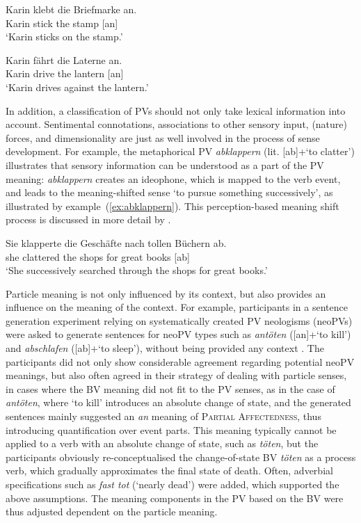 \documentclass[output=paper]{langsci/langscibook}
\begin{document}
\ea\label{ex:ankleben}
\gll Karin klebt die Briefmarke an.\\
Karin stick the stamp [an]\\
\glt `Karin sticks on the stamp.'
\z

\ea\label{ex:anfahrenLaterne1}
\gll Karin fährt die Laterne an.\\
Karin drive the lantern [an]\\
\glt `Karin drives against the lantern.'
\z

In addition, a classification of PVs should not only take lexical
information into account. Sentimental connotations, associations to
other sensory input, (nature) forces, and dimensionality are just as
well involved in the process of sense development. For example, the
metaphorical PV \textit{abklappern} (lit. [ab]+`to clatter')
illustrates that sensory information can be understood as a part of
the PV meaning: \textit{abklappern} creates an ideophone, which is
mapped to the verb event, and leads to the meaning-shifted sense `to
pursue something successively', as illustrated by
example~(\ref{ex:abklappern}). This perception-based meaning shift
process is discussed in more detail by \cite{SpringorumEtAl:13}.

\ea\label{ex:abklappern}
\gll Sie klapperte die Geschäfte nach tollen Büchern ab.\\
she clattered the shops for great books [ab]\\
\glt `She successively searched through the shops for great books.'
\z

Particle meaning is not only influenced by its context, but also
provides an influence on the meaning of the context. For example,
participants in a sentence generation experiment relying on
systematically created PV neologisms (neoPVs) were asked to generate
sentences for neoPV types such as \textit{antöten} ([an]+`to kill')
and \textit{abschlafen} ([ab]+`to sleep'), without being provided any
context \citep{SpringorumEtAl:13cALTER}. The participants did not only
show considerable agreement regarding potential neoPV meanings, but
also often agreed in their strategy of dealing with particle senses,
in cases where the BV meaning did not fit to the PV senses, as in the
case of \textit{antöten}, where `to kill' introduces an absolute
change of state, and the generated sentences mainly suggested an
\textit{an} meaning of \textsc{Partial Affectedness}, thus introducing
quantification over event parts. This meaning typically cannot be
applied to a verb with an absolute change of state, such as
\textit{töten}, but the participants obviously re-conceptualised the
change-of-state BV \textit{töten} as a process verb, which gradually
approximates the final state of death. Often, adverbial specifications
such as \textit{fast tot} (`nearly dead') were added, which supported
the above assumptions. The meaning components in the PV based on the
BV were thus adjusted dependent on the particle meaning.
\end{document}
